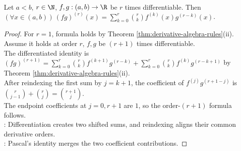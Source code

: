 \begin{theorem} \label{thm:higher-order-leibniz-product-rule} \\
Let $a<b$, $r\in\N$, $f,g:(a,b)\to\R$ be $r$ times differentiable. Then $(\forall x\in(a,b))\,(fg)^{(r)}(x)=\sum\limits_{k=0}^{r}\binom{r}{k}f^{(k)}(x)g^{(r-k)}(x)$.
\begin{proof}
For $r=1$, formula holds by Theorem \ref{thm:derivative-algebra-rules}(ii). Assume it holds at order $r$, $f,g$ be $(r+1)$ times differentiable.\\
The differentiated identity is $(fg)^{(r+1)}=\sum\limits_{k=0}^{r}\binom{r}{k}f^{(k+1)}g^{(r-k)}+\sum\limits_{k=0}^{r}\binom{r}{k}f^{(k)}g^{(r-k+1)}$ by Theorem \ref{thm:derivative-algebra-rules}(ii).\\
After reindexing the first sum by $j=k+1$, the coefficient of $f^{(j)}g^{(r+1-j)}$ is $\binom{r}{j-1}+\binom{r}{j}=\binom{r+1}{j}$.\\
The endpoint coefficients at $j=0,r+1$ are $1$, so the order-$(r+1)$ formula follows.\\
: Differentiation creates two shifted sums, and reindexing aligns their common derivative orders.\\
: Pascal's identity merges the two coefficient contributions.
\end{proof}
\end{theorem}


